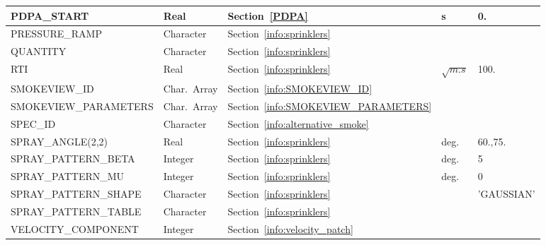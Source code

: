 \documentclass[11pt]{book}
\begin{document}
\begin{longtable}{@{\extracolsep{\fill}}|l|l|l|l|l|}
{\ct PDPA\_START}                       & Real          & Section~\ref{PDPA}                        & s                     & 0.        \\ \hline
{\ct PRESSURE\_RAMP}                    & Character     & Section~\ref{info:sprinklers}             &                       &           \\ \hline
{\ct QUANTITY}                          & Character     & Section~\ref{info:sprinklers}             &                       &           \\ \hline
{\ct RTI}                               & Real          & Section~\ref{info:sprinklers}             & $\sqrt{\si{m.s}}$   & 100.      \\ \hline
{\ct SMOKEVIEW\_ID}                     & Char.~Array   & Section~\ref{info:SMOKEVIEW_ID}           &                       &           \\ \hline
{\ct SMOKEVIEW\_PARAMETERS}             & Char.~Array   & Section~\ref{info:SMOKEVIEW_PARAMETERS}   &                       &           \\ \hline
{\ct SPEC\_ID}                          & Character     & Section~\ref{info:alternative_smoke}      &                       &           \\ \hline
{\ct SPRAY\_ANGLE(2,2)}                 & Real          & Section~\ref{info:sprinklers}             & deg.                  & 60.,75.   \\ \hline
{\ct SPRAY\_PATTERN\_BETA}              & Integer       & Section~\ref{info:sprinklers}             & deg.                  & 5          \\ \hline
{\ct SPRAY\_PATTERN\_MU}                & Integer       & Section~\ref{info:sprinklers}             & deg.                  & 0          \\ \hline
{\ct SPRAY\_PATTERN\_SHAPE}             & Character     & Section~\ref{info:sprinklers}             &                       & {\ct 'GAUSSIAN'}  \\ \hline
{\ct SPRAY\_PATTERN\_TABLE}             & Character     & Section~\ref{info:sprinklers}             &                       &           \\ \hline
{\ct VELOCITY\_COMPONENT}               & Integer       & Section~\ref{info:velocity_patch}         &                       &           \\ \hline
\end{longtable}


\vspace{\baselineskip}
\end{document}
